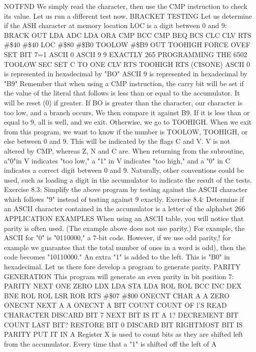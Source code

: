 \documentclass{book}
\begin{document}
NOTFND
We simply read the character, then use the CMP instruction to check
its value.
Let us run a different test now.
BRACKET TESTING
Let us determine if the ASH character at memory location LOC
is a digit between 0 and 9:
BRACK
OUT
LDA
ADC
LDA
ORA
CMP
BCC
CMP
BEQ
BCS
CLC
CLV
RTS
#\$40
#\$40
LOC
#\$80
#\$B0
TOOLOW
#\$B9
OUT
TOOHIGH
FORCE OVEF
SET BIT 7=1
ASCII 0
ASCII 9
9 EXACTLY
265
PROGRAMMING THE 6502
TOOLOW SEC SET C TO ONE
CLV
RTS
TOOHIGH RTS (CISONE)
ASCII 0 is represented in hexadecimal by "BO"
ASCII 9 is represented in hexadecimal by "B9"
Remember that when using a CMP instruction, the carry bit will be
set if the value of the literal that follows is less than or equal to the
accumulator. It will be reset (0) if greater.
If BO is greater than the character, our character is too low, and
a branch occurs.
We then compare it against B9. If it is less than or equal to 9,
all is well, and we exit. Otherwise, we go to TOOHIGH.
When we exit from this program, we want to know if the number
is TOOLOW, TOOHIGH, or else between 0 and 9. This will be
indicated by the flags C and V. V is not altered by CMP, whereas Z, N
and C are.
When returning from the subroutine, a"0"in V indicates "too low," a
"1" in V indicates "too high," and a "0" in C indicates a correct digit
between 0 and 9.
Naturally, other conventions could be used, such as loading a digit
in the accumulator to indicate the result of the tests.
Exercise 8.3: Simplify the above program by testing against the
ASCII character which follows "9" instead of testing against 9
exactly.
Exercise 8.4: Determine if an ASCII character contained in the
accumulator is a letter of the alphabet
266
APPLICATION EXAMPLES
When using an ASCII table, you will notice that parity is often
used. (The example above does not use parity.) For example, the
ASCII for "0" is "0110000," a 7-bit code. However, if we use odd
parity,! for example we guarantee that the total number of ones
in a word is odd), then the code becomes "10110000." An extra
"1" is added to the left. This is "B0" in hexadecimal. Let us there
fore develop a program to generate parity.
PARITY GENERATION
This program will generate an even parity in bit position 7:
PARITY
NEXT
ONE
ZERO
LDX
LDA
STA
LDA
ROL
ROL
BCC
INC
DEX
BNE
ROL
ROL
LSR
ROR
RTS
#\$07
#\$00
ONECNT
CHAR
A
A
ZERO
ONECNT
NEXT
A
A
ONECNT
A
BIT COUNT
COUNT OF l'S
READ CHARACTER
DISCARD BIT 7
NEXT BIT
IS IT A 1?
DECREMENT BIT COUNT
LAST BIT?
RESTORE BIT 0
DISCARD BIT
RIGHTMOST BIT IS PARITY
PUT IT IN A
Register X is used to count bits as they are shifted left from the
accumulator. Every time that a "1" is shifted off the left of A
\end{document}
